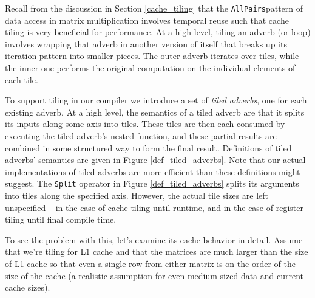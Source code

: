 \documentclass[preprint,9pt]{sigplanconf}
\begin{document}
Recall from the discussion in Section \ref{cache_tiling} that the \lstinline{AllPairs}pattern of data access in matrix multiplication involves temporal reuse such that cache tiling is very beneficial for performance.  At a high level, tiling an adverb (or loop) involves wrapping that adverb in another version of itself that breaks up its iteration pattern into smaller pieces.  The outer adverb iterates over tiles, while the inner one performs the original computation on the individual elements of each tile.

To support tiling in our compiler we introduce a set of \emph{tiled adverbs}, one for each existing adverb.  At a high level, the semantics of a tiled adverb are that it splits its inputs along some axis into tiles.  These tiles are then each consumed by executing the tiled adverb's nested function, and these partial results are combined in some structured way to form the final result.  Definitions of tiled adverbs' semantics are given in Figure \ref{def_tiled_adverbs}.  Note that our actual implementations of tiled adverbs are more efficient than these definitions might suggest.  The \lstinline{Split} operator in Figure \ref{def_tiled_adverbs} splits its arguments into tiles along the specified axis.  However, the actual tile sizes are left unspecified -- in the case of cache tiling until runtime, and in the case of register tiling until final compile time.
% 
% 
% 
% 

To see the problem with this, let's examine its cache behavior in detail.  Assume that we're tiling for L1 cache and that the matrices are much larger than the size of L1 cache so that even a single row from either matrix is on the order of the size of the cache (a realistic assumption for even medium sized data and current cache sizes).
\end{document}
